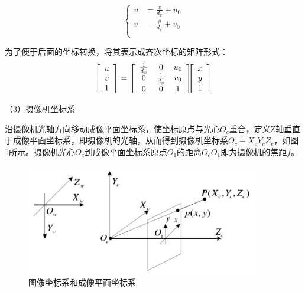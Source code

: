 \begin{equation}\label{eq:2_1_image_coord}
\left\{
	\begin{aligned}
	u&=\frac{x}{d_x}+u_0 \\
	v&=\frac{y}{d_y}+v_0 \\
	\end{aligned}
\right.
\end{equation}

为了便于后面的坐标转换，将其表示成齐次坐标的矩阵形式：
\begin{eqnarray}\label{eq:2_1_image_coord_homogeneous}
\left[\begin{array}{c} u \\ v \\ 1 \end{array} \right]
=
\left[\begin{array}{ccc}
\frac{1}{d_x} & 0 & u_0 \\
0 & \frac{1}{d_y} & v_0 \\
0 & 0 & 1
\end{array}
\right]
\hspace{-6pt} %
\left[\begin{array}{c} x \\ y \\ 1 \end{array}\right]
\end{eqnarray}

（3）摄像机坐标系

沿摄像机光轴方向移动成像平面坐标系，使坐标原点与光心$O_c$重合，定义Z轴垂直于成像平面坐标系，即摄像机的光轴，从而得到摄像机坐标系$O_c-X_cY_cZ_c$，如图\ref{fig:2_1_camera_and_world_coord}所示。摄像机光心$O_c$到成像平面坐标系原点$O_1$的距离$O_c O_1$即为摄像机的焦距$f$。

\begin{figure}[!htb] %
	\centering
	\includegraphics[width=4in]{figures/2_1_camera_and_world_coord}
	\caption{图像坐标系和成像平面坐标系}\label{fig:2_1_camera_and_world_coord}
\end{figure}

